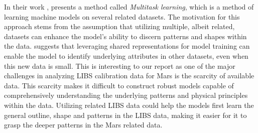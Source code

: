 In their work \citet{caruana_no_1997}, presents a method called \textit{Multitask learning}, which is a method of learning machine models on several related datasets. 
The motivation for this approach stems from the assumption that utilizing multiple, albeit related, datasets can enhance the model's ability to discern patterns and shapes within the data.
\citet{caruana_no_1997} suggests that leveraging shared representations for model training can enable the model to identify underlying attributes in other datasets, even when this new data is small.
This is interesting to our report as one of the major challenges in analyzing LIBS calibration data for Mars is the scarcity of available data.
This scarcity makes it difficult to construct robust models capable of comprehensively understanding the underlying patterns and physical principles within the data.
Utilizing related LIBS data could help the models first learn the general outline, shape and patterns in the LIBS data, making it easier for it to grasp the deeper patterns in the Mars related data.


